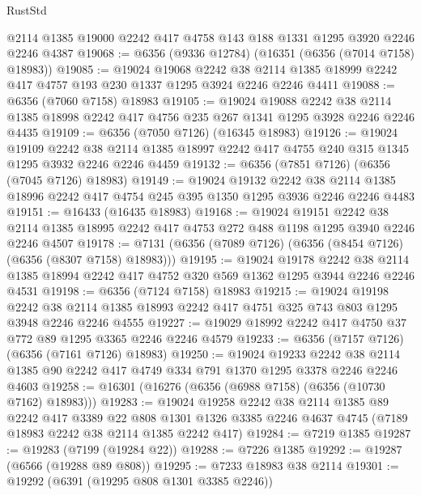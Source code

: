 \begin{lexlean}{RustStd}
\begin{coremodule}
{\begin{coremodule}
{{{{{{{{{{{{{{{{{{{{{{{{{{    @2114
    @1385
    @19000
    @2242
    @417
    @4758
    @143
    @188
    @1331
    @1295
    @3920
    @2246
    @2246
    @4387
@19068 := @6356 (@9336 @12784) (@16351 (@6356 (@7014 @7158) @18983))
@19085 := @19024
    @19068
    @2242
    @38
    @2114
    @1385
    @18999
    @2242
    @417
    @4757
    @193
    @230
    @1337
    @1295
    @3924
    @2246
    @2246
    @4411
@19088 := @6356 (@7060 @7158) @18983
@19105 := @19024
    @19088
    @2242
    @38
    @2114
    @1385
    @18998
    @2242
    @417
    @4756
    @235
    @267
    @1341
    @1295
    @3928
    @2246
    @2246
    @4435
@19109 := @6356 (@7050 @7126) (@16345 @18983)
@19126 := @19024
    @19109
    @2242
    @38
    @2114
    @1385
    @18997
    @2242
    @417
    @4755
    @240
    @315
    @1345
    @1295
    @3932
    @2246
    @2246
    @4459
@19132 := @6356 (@7851 @7126) (@6356 (@7045 @7126) @18983)
@19149 := @19024
    @19132
    @2242
    @38
    @2114
    @1385
    @18996
    @2242
    @417
    @4754
    @245
    @395
    @1350
    @1295
    @3936
    @2246
    @2246
    @4483
@19151 := @16433 (@16435 @18983)
@19168 := @19024
    @19151
    @2242
    @38
    @2114
    @1385
    @18995
    @2242
    @417
    @4753
    @272
    @488
    @1198
    @1295
    @3940
    @2246
    @2246
    @4507
@19178 := @7131 (@6356 (@7089 @7126) (@6356 (@8454 @7126) (@6356 (@8307 @7158) @18983)))
@19195 := @19024
    @19178
    @2242
    @38
    @2114
    @1385
    @18994
    @2242
    @417
    @4752
    @320
    @569
    @1362
    @1295
    @3944
    @2246
    @2246
    @4531
@19198 := @6356 (@7124 @7158) @18983
@19215 := @19024
    @19198
    @2242
    @38
    @2114
    @1385
    @18993
    @2242
    @417
    @4751
    @325
    @743
    @803
    @1295
    @3948
    @2246
    @2246
    @4555
@19227 := @19029 @18992 @2242 @417 @4750 @37 @772 @89 @1295 @3365 @2246 @2246 @4579
@19233 := @6356 (@7157 @7126) (@6356 (@7161 @7126) @18983)
@19250 := @19024
    @19233
    @2242
    @38
    @2114
    @1385
    @90
    @2242
    @417
    @4749
    @334
    @791
    @1370
    @1295
    @3378
    @2246
    @2246
    @4603
@19258 := @16301 (@16276 (@6356 (@6988 @7158) (@6356 (@10730 @7162) @18983)))
@19283 := @19024
    @19258
    @2242
    @38
    @2114
    @1385
    @89
    @2242
    @417
    @3389
    @22
    @808
    @1301
    @1326
    @3385
    @2246
    @4637
    @4745
    (@7189 @18983 @2242 @38 @2114 @1385 @2242 @417)
@19284 := @7219 @1385
@19287 := @19283 (@7199 (@19284 @22))
@19288 := @7226 @1385
@19292 := @19287 (@6566 (@19288 @89 @808))
@19295 := @7233 @18983 @38 @2114
@19301 := @19292 (@6391 (@19295 @808 @1301 @3385 @2246))
}}}}}}}}}}}}}}}}}}}}}}}}}}
\end{coremodule}}
\end{coremodule}
\end{lexlean}
